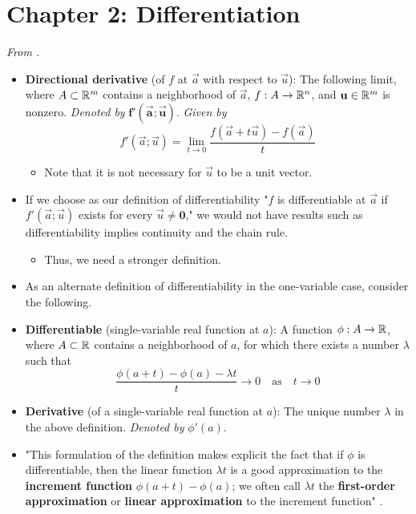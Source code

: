 \documentclass[../notes.tex]{subfiles}
\begin{document}
\section{Chapter 2: Differentiation}
\emph{From \textcite{bib:Munkres}.}
\begin{itemize}
    \item {}\textbf{Directional derivative} (of $f$ at $\vec{a}$ with respect to $\vec{u}$): The following limit, where $A\subset\mathbb{R}^m$ contains a neighborhood of $\vec{a}$, $f:A\to\mathbb{R}^n$, and $\mathbf{u}\in\mathbb{R}^m$ is nonzero. \emph{Denoted by} $\bm{f'(\vec{a};\vec{u})}$. \emph{Given by}
    \begin{equation*}
        f'(\vec{a};\vec{u}) = \lim_{t\to 0}\frac{f(\vec{a}+t\vec{u})-f(\vec{a})}{t}
    \end{equation*}
    \begin{itemize}
        \item Note that it is not necessary for $\vec{u}$ to be a unit vector.
    \end{itemize}
    \item If we choose as our definition of differentiability "$f$ is differentiable at $\vec{a}$ if $f'(\vec{a};\vec{u})$ exists for every $\vec{u}\neq\bm{0}$," we would not have results such as differentiability implies continuity and the chain rule.
    \begin{itemize}
        \item Thus, we need a stronger definition.
    \end{itemize}
    \item As an alternate definition of differentiability in the one-variable case, consider the following.
    \item \textbf{Differentiable} (single-variable real function at $a$): A function $\phi:A\to\mathbb{R}$, where $A\subset\mathbb{R}$ contains a neighborhood of $a$, for which there exists a number $\lambda$ such that
    \begin{equation*}
        \frac{\phi(a+t)-\phi(a)-\lambda t}{t} \to 0
        \quad\text{as}\quad
        t \to 0
    \end{equation*}
    \item \textbf{Derivative} (of a single-variable real function at $a$): The unique number $\lambda$ in the above definition. \emph{Denoted by} $\phi'(a)$.
    \item "This formulation of the definition makes explicit the fact that if $\phi$ is differentiable, then the linear function $\lambda t$ is a good approximation to the \textbf{increment function} $\phi(a+t)-\phi(a)$; we often call $\lambda t$ the \textbf{first-order approximation} or \textbf{linear approximation} to the increment function" \parencite[43]{bib:Munkres}.

\end{itemize}
\end{document}
